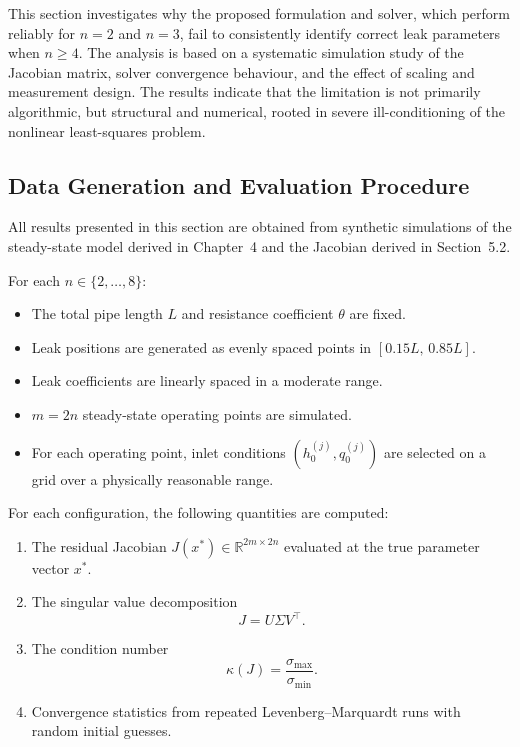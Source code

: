 
This section investigates why the proposed formulation and solver, which perform reliably for $n=2$ and $n=3$, fail to consistently identify correct leak parameters when $n \geq 4$. The analysis is based on a systematic simulation study of the Jacobian matrix, solver convergence behaviour, and the effect of scaling and measurement design. The results indicate that the limitation is not primarily algorithmic, but structural and numerical, rooted in severe ill-conditioning of the nonlinear least-squares problem.

\subsection*{Data Generation and Evaluation Procedure}

All results presented in this section are obtained from synthetic simulations of the steady-state model derived in Chapter~4 and the Jacobian derived in Section~5.2.

For each $n \in \{2,\dots,8\}$:

\begin{itemize}
    \item The total pipe length $L$ and resistance coefficient $\theta$ are fixed.
    \item Leak positions are generated as evenly spaced points in $[0.15L,\,0.85L]$.
    \item Leak coefficients are linearly spaced in a moderate range.
    \item $m = 2n$ steady-state operating points are simulated.
    \item For each operating point, inlet conditions $(h_0^{(j)}, q_0^{(j)})$ are selected on a grid over a physically reasonable range.
\end{itemize}

For each configuration, the following quantities are computed:

\begin{enumerate}
    \item The residual Jacobian $J(x^\ast) \in \mathbb{R}^{2m \times 2n}$ evaluated at the true parameter vector $x^\ast$.
    \item The singular value decomposition
    \[
    J = U \Sigma V^\top.
    \]
    \item The condition number
    \[
    \kappa(J) = \frac{\sigma_{\max}}{\sigma_{\min}}.
    \]
    \item Convergence statistics from repeated Levenberg--Marquardt runs with random initial guesses.
\end{enumerate}

